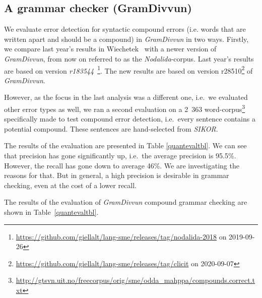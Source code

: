 \documentclass[free]{flammie}
\begin{document}
\subsection{A grammar checker (GramDivvun)}

We evaluate error detection for syntactic compound errors (i.e. words that are written
apart and should be a compound) in \textit{GramDivvun} in two ways.
Firstly, we compare last year's results in Wiechetek~\cite{Wiechetek2019b} with a
newer version of \textit{GramDivvun}, from now on referred to as the \textit{Nodalida}-corpus. %
Last year's results are based on version \textit{r183544}~\cite{Wiechetek2019b}\footnote{\url{https://github.com/giellalt/lang-sme/releases/tag/nodalida-2018} on 2019-09-26}. The new results are based on version {r28510}\footnote{\url{https://github.com/giellalt/lang-sme/releases/tag/clicit} on 2020-09-07} of \textit{GramDivvun}.

However, as the focus in the last analysis was a different one, i.e.\ we evaluated other error types as well, we %
ran a second evaluation on a
2~363 word-corpus\footnote{\url{http://gtsvn.uit.no/freecorpus/orig/sme/odda_mahppa/compounds.correct.txt}}
specifically made to test compound error detection, i.e.\ every sentence contains a potential compound. These sentences are hand-selected from \textit{SIKOR}.

The results of the evaluation are presented in Table \ref{quantevaltbl}. We can see that precision has gone significantly up, i.e.\ the average precision is 95.5\%. However, the recall has gone down to average 46\%. We are investigating the reasons for that. But in general, a high precision is desirable in grammar checking, even at the cost of a lower recall.

The results of the evaluation of \textit{GramDivvun} compound grammar checking are shown in
Table~\ref{quantevaltbl}.
\end{document}
